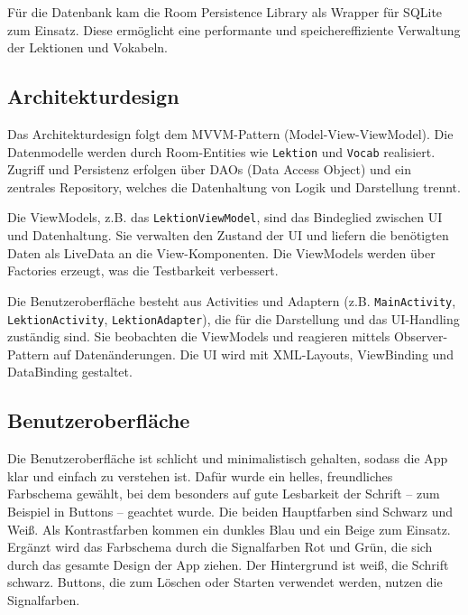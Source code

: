 \documentclass[12pt,a4paper]{article}
\begin{document}
Für die Datenbank kam die Room Persistence Library als Wrapper für SQLite zum Einsatz. Diese ermöglicht eine performante und speichereffiziente Verwaltung der Lektionen und Vokabeln.

\subsection{Architekturdesign}
Das Architekturdesign folgt dem MVVM-Pattern (Model-View-ViewModel). Die Datenmodelle werden durch Room-Entities wie \texttt{Lektion} und \texttt{Vocab} realisiert. Zugriff und Persistenz erfolgen über DAOs (Data Access Object) und ein zentrales Repository, welches die Datenhaltung von Logik und Darstellung trennt.

Die ViewModels, z.B. das \texttt{LektionViewModel}, sind das Bindeglied zwischen UI und Datenhaltung. Sie verwalten den Zustand der UI und liefern die benötigten Daten als LiveData an die View-Komponenten. Die ViewModels werden über Factories erzeugt, was die Testbarkeit verbessert.

Die Benutzeroberfläche besteht aus Activities und Adaptern (z.B. \texttt{MainActivity}, \texttt{LektionActivity}, \texttt{LektionAdapter}), die für die Darstellung und das UI-Handling zuständig sind. Sie beobachten die ViewModels und reagieren mittels Observer-Pattern auf Datenänderungen. Die UI wird mit XML-Layouts, ViewBinding und DataBinding gestaltet.

\subsection{Benutzeroberfläche}
Die Benutzeroberfläche ist schlicht und minimalistisch gehalten, sodass die App klar und einfach zu verstehen ist. Dafür wurde ein helles, freundliches Farbschema gewählt, bei dem besonders auf gute Lesbarkeit der Schrift – zum Beispiel in Buttons – geachtet wurde. Die beiden Hauptfarben sind Schwarz und Weiß. Als Kontrastfarben kommen ein dunkles Blau und ein Beige zum Einsatz. Ergänzt wird das Farbschema durch die Signalfarben Rot und Grün, die sich durch das gesamte Design der App ziehen. Der Hintergrund ist weiß, die Schrift schwarz. Buttons, die zum Löschen oder Starten verwendet werden, nutzen die Signalfarben.
\end{document}
